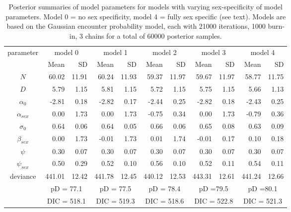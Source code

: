 {\begin{table}[ht]
\centering
\caption{
Posterior summaries of model parameters for models with varying
sex-specificity of model parameters. Model 0 = no sex specificity,
model 4 = fully sex specific (see text). Models are based on the 
 Gaussian encounter probability model, each with 21000 iterations,
 1000 burn-in, 3 chains for a total of 60000 posterior samples. }
{\tiny
\begin{tabular}{crrrrrrrrrr} \hline \hline
parameter & \multicolumn{2}{c}{model 0} &
\multicolumn{2}{c}{model 1} &
\multicolumn{2}{c}{model 2} &
\multicolumn{2}{c}{model 3} &
\multicolumn{2}{c}{model 4}  \\
          &    Mean &   SD &      Mean &   SD &      Mean &   SD &
          Mean&     SD  & Mean & SD \\ \hline
$N$       &  60.02& 11.91&  60.24& 11.93&  59.37& 11.97&  59.67& 11.97&  58.77& 11.75\\
$D$       &   5.79&  1.15&   5.81&  1.15&   5.72&  1.15&   5.75&  1.15&   5.66&  1.13\\
$\alpha_0$&  -2.81&  0.18&  -2.82&  0.17&  -2.44&  0.25&  -2.82&  0.18&  -2.43&  0.25\\
$\alpha_{sex}$ &   0.00&  1.73&   0.00&  1.73&  -0.75&  0.34&   0.00&  1.73&  -0.79&  0.36\\
$\sigma_0$    &  0.64&  0.06&   0.64&  0.05&   0.66&  0.06&   0.65&  0.08&   0.63&  0.09\\
$\beta_{sex} $ &  0.00&  1.73&  -0.01&  1.73&   0.01&  1.74&  -0.01&  0.17&   0.10&  0.18\\
$\psi$         &0.30&  0.07&   0.30&  0.07&   0.30&  0.07&   0.30&  0.07&   0.30&  0.07\\
$\psi_{sex}$    & 0.50&  0.29&   0.52&  0.10&   0.56&  0.10&   0.52&  0.11&   0.54&  0.11\\
deviance   &441.01& 12.42& 441.78& 12.45& 440.12& 12.53& 443.31& 12.61&441.24& 12.66 \\
& \multicolumn{2}{c}{pD = 77.1} &\multicolumn{2}{c}{pD = 77.5} & \multicolumn{2}{c}{pD = 78.4}& \multicolumn{2}{c}{pD =79.5}  & \multicolumn{2}{c}{pD =80.1}  \\
& \multicolumn{2}{c}{DIC = 518.1} & \multicolumn{2}{c}{DIC = 519.3} &\multicolumn{2}{c}{DIC = 518.6} &    \multicolumn{2}{c}{DIC = 522.8} &\multicolumn{2}{c}{DIC = 521.3} \\ \hline
\end{tabular}
}
\label{gof.tab.dic}
\end{table}





}
